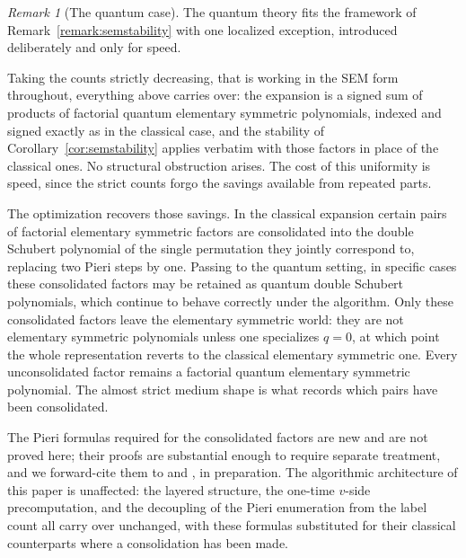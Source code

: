 \documentclass{amsart}
\theoremstyle{definition}
\theoremstyle{remark}
\newtheorem{remark}[lemma]{Remark}
\numberwithin{equation}{section}
\begin{document}
\begin{remark}[The quantum case] \label{remark:quantumsem}
The quantum theory fits the framework of Remark~\ref{remark:semstability} with one localized exception, introduced deliberately and only for speed.

Taking the counts strictly decreasing, that is working in the SEM form throughout, everything above carries over: the expansion is a signed sum of products of factorial quantum elementary symmetric polynomials, indexed and signed exactly as in the classical case, and the stability of Corollary~\ref{cor:semstability} applies verbatim with those factors in place of the classical ones. No structural obstruction arises. The cost of this uniformity is speed, since the strict counts forgo the savings available from repeated parts.

The optimization recovers those savings. In the classical expansion certain pairs of factorial elementary symmetric factors are consolidated into the double Schubert polynomial of the single permutation they jointly correspond to, replacing two Pieri steps by one. Passing to the quantum setting, in specific cases these consolidated factors may be retained as quantum double Schubert polynomials, which continue to behave correctly under the algorithm. Only these consolidated factors leave the elementary symmetric world: they are not elementary symmetric polynomials unless one specializes $q=0$, at which point the whole representation reverts to the classical elementary symmetric one. Every unconsolidated factor remains a factorial quantum elementary symmetric polynomial. The almost strict medium shape is what records which pairs have been consolidated.

The Pieri formulas required for the consolidated factors are new and are not proved here; their proofs are substantial enough to require separate treatment, and we forward-cite them to \cite{samuelquantumpieri} and \cite{samuelquantumdoubleelem}, in preparation. The algorithmic architecture of this paper is unaffected: the layered structure, the one-time $v$-side precomputation, and the decoupling of the Pieri enumeration from the label count all carry over unchanged, with these formulas substituted for their classical counterparts where a consolidation has been made.
\end{remark}
\end{document}
